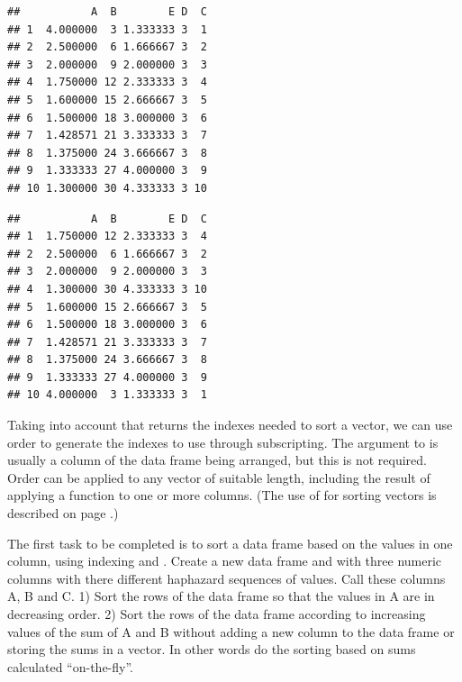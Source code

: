 \documentclass[krantz2]{krantz}\usepackage{knitr}%
\begin{document}
\begin{knitrout}\footnotesize
{}\color{fgcolor}\begin{kframe}
\begin{alltt}
\end{alltt}
\begin{verbatim}
##           A  B        E D  C
## 1  4.000000  3 1.333333 3  1
## 2  2.500000  6 1.666667 3  2
## 3  2.000000  9 2.000000 3  3
## 4  1.750000 12 2.333333 3  4
## 5  1.600000 15 2.666667 3  5
## 6  1.500000 18 3.000000 3  6
## 7  1.428571 21 3.333333 3  7
## 8  1.375000 24 3.666667 3  8
## 9  1.333333 27 4.000000 3  9
## 10 1.300000 30 4.333333 3 10
\end{verbatim}
\begin{alltt}
\hlstd{my_data_frame.df[}\hlstd{(}\hlstd{,} \hlstd{,} \hlstd{), ]} \hlkwb{<-} \hlstd{my_data_frame.df[}\hlstd{(}\hlstd{,} \hlstd{,} \hlstd{), ]}
\end{alltt}
\begin{verbatim}
##           A  B        E D  C
## 1  1.750000 12 2.333333 3  4
## 2  2.500000  6 1.666667 3  2
## 3  2.000000  9 2.000000 3  3
## 4  1.300000 30 4.333333 3 10
## 5  1.600000 15 2.666667 3  5
## 6  1.500000 18 3.000000 3  6
## 7  1.428571 21 3.333333 3  7
## 8  1.375000 24 3.666667 3  8
## 9  1.333333 27 4.000000 3  9
## 10 4.000000  3 1.333333 3  1
\end{verbatim}
\end{kframe}
\end{knitrout}

Taking into account that  returns the indexes needed to sort a vector, we can use order to generate the indexes to use through subscripting. The argument to  is usually a column of the data frame being arranged, but this is not required. Order can be applied to any vector of suitable length, including the result of applying a function to one or more columns. (The use of  for sorting vectors is described on page \pageref{box:vec:sort}.)

\begin{playground}
The first task to be completed is to sort a data frame based on the values in one column, using indexing and . Create a new data frame and with three numeric columns with there different haphazard sequences of values. Call these columns A, B and C. 1) Sort the rows of the data frame so that the values in A are in decreasing order. 2) Sort the rows of the data frame according to increasing values of the sum of A and B without adding a new column to the data frame or storing the sums in a vector. In other words do the sorting based on sums calculated ``on-the-fly''.
\end{playground}
\end{document}
